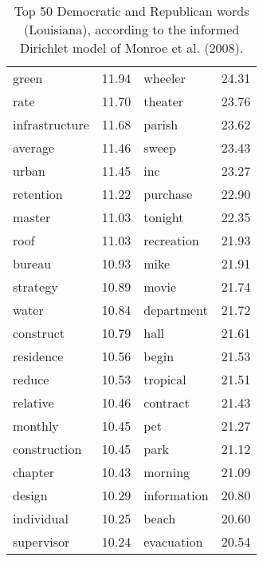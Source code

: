 \begin{table}[ht]
\begin{tabular}{lrlr}
  green & 11.94 & wheeler & 24.31 \\ 
  rate & 11.70 & theater & 23.76 \\ 
  infrastructure & 11.68 & parish & 23.62 \\ 
  average & 11.46 & sweep & 23.43 \\ 
  urban & 11.45 & inc & 23.27 \\ 
  retention & 11.22 & purchase & 22.90 \\ 
  master & 11.03 & tonight & 22.35 \\ 
  roof & 11.03 & recreation & 21.93 \\ 
  bureau & 10.93 & mike & 21.91 \\ 
  strategy & 10.89 & movie & 21.74 \\ 
  water & 10.84 & department & 21.72 \\ 
  construct & 10.79 & hall & 21.61 \\ 
  residence & 10.56 & begin & 21.53 \\ 
  reduce & 10.53 & tropical & 21.51 \\ 
  relative & 10.46 & contract & 21.43 \\ 
  monthly & 10.45 & pet & 21.27 \\ 
  construction & 10.45 & park & 21.12 \\ 
  chapter & 10.43 & morning & 21.09 \\ 
  design & 10.29 & information & 20.80 \\ 
  individual & 10.25 & beach & 20.60 \\ 
  supervisor & 10.24 & evacuation & 20.54 \\ 
   \hline
\end{tabular}
\endgroup
\caption{Top 50 Democratic and Republican words (Louisiana), according to the informed Dirichlet model of Monroe et al. (2008).} 
\label{tabFightinLA}
\end{table}


